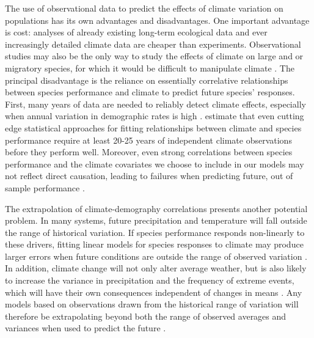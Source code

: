 \documentclass[11pt]{article}
\begin{document}
\begin{doublespacing}
The use of observational data to predict the effects of climate variation on populations has its own advantages and disadvantages. One important advantage is cost: analyses of already existing long-term ecological data and ever increasingly detailed climate data are cheaper than experiments. Observational studies may also be the only way to study the effects of climate on large and or migratory species, for which it would be difficult to manipulate climate \citep{koons_climate_2012,jenouvrier_demographic_2009,aubry_climate_2013}. The principal disadvantage is the reliance on essentially correlative relationships between species performance and climate to predict future species' responses. First, many years of data are needed to reliably detect climate effects, especially when annual variation in demographic rates is high \citep{teller_linking_2016,gerber_optimal_2015}. \citep{teller_linking_2016} estimate that even cutting edge statistical approaches for fitting relationships between climate and species performance require at least 20-25 years of independent climate observations before they perform well. Moreover, even strong correlations between species performance and the climate covariates we choose to include in our models may not reflect direct causation, leading to failures when predicting future, out of sample performance \citep{hilborn_correlation_2016}. 

The extrapolation of climate-demography correlations presents another potential problem. In many systems, future precipitation and temperature will fall outside the range of historical variation. If species performance responds non-linearly to these drivers, fitting linear models for species responses to climate may produce larger errors when future conditions are outside the range of observed variation \citep{doak_demographic_2010}. In addition, climate change will not only alter average weather, but is also likely to increase the variance in precipitation and the frequency of extreme events, which will have their own consequences independent of changes in means \citep{gherardi_enhanced_2015,jentsch_new_2007}. Any models based on observations drawn from the historical range of variation will therefore be extrapolating beyond both the range of observed averages and variances when used to predict the future \citep{williams_novel_2007}. 


\end{doublespacing}
\end{document}
